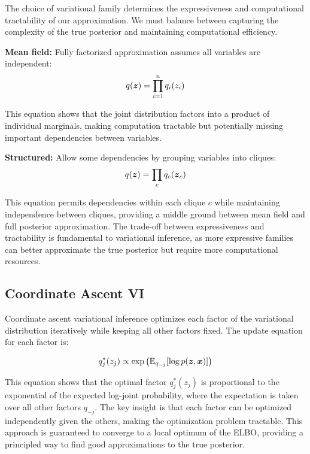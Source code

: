 The choice of variational family determines the expressiveness and computational tractability of our approximation. We must balance between capturing the complexity of the true posterior and maintaining computational efficiency.

\textbf{Mean field:} Fully factorized approximation assumes all variables are independent:
\begin{equation}
q(\boldsymbol{z}) = \prod_{i=1}^{n} q_i(z_i)
\end{equation}

This equation shows that the joint distribution factors into a product of individual marginals, making computation tractable but potentially missing important dependencies between variables.

\textbf{Structured:} Allow some dependencies by grouping variables into cliques:
\begin{equation}
q(\boldsymbol{z}) = \prod_{c} q_c(\boldsymbol{z}_c)
\end{equation}

This equation permits dependencies within each clique $c$ while maintaining independence between cliques, providing a middle ground between mean field and full posterior approximation. The trade-off between expressiveness and tractability is fundamental to variational inference, as more expressive families can better approximate the true posterior but require more computational resources.

\subsection{Coordinate Ascent VI}

Coordinate ascent variational inference optimizes each factor of the variational distribution iteratively while keeping all other factors fixed. The update equation for each factor is:

\begin{equation}
q_j^*(z_j) \propto \exp\left(\mathbb{E}_{q_{-j}}[\log p(\boldsymbol{z}, \boldsymbol{x})]\right)
\end{equation}

This equation shows that the optimal factor $q_j^*(z_j)$ is proportional to the exponential of the expected log-joint probability, where the expectation is taken over all other factors $q_{-j}$. The key insight is that each factor can be optimized independently given the others, making the optimization problem tractable. This approach is guaranteed to converge to a local optimum of the ELBO, providing a principled way to find good approximations to the true posterior.

